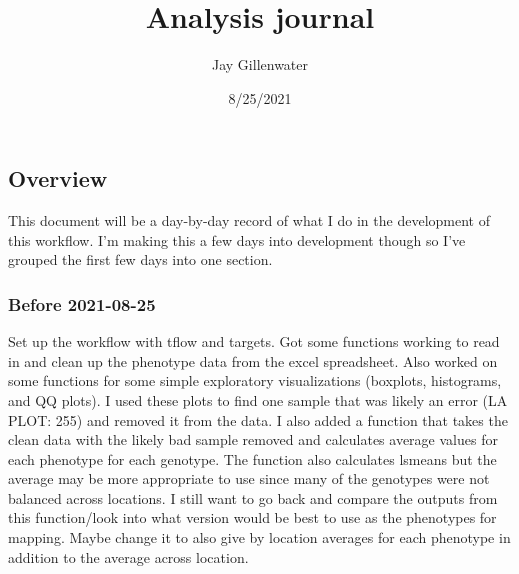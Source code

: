 \documentclass[
]{article}
\title{Analysis journal}
\author{Jay Gillenwater}
\date{8/25/2021}
\begin{document}
\maketitle

\hypertarget{overview}{%
\subsection{Overview}\label{overview}}

This document will be a day-by-day record of what I do in the
development of this workflow. I'm making this a few days into
development though so I've grouped the first few days into one section.

\hypertarget{before-2021-08-25}{%
\subsubsection{Before 2021-08-25}\label{before-2021-08-25}}

Set up the workflow with tflow and targets. Got some functions working
to read in and clean up the phenotype data from the excel spreadsheet.
Also worked on some functions for some simple exploratory visualizations
(boxplots, histograms, and QQ plots). I used these plots to find one
sample that was likely an error (LA PLOT: 255) and removed it from the
data. I also added a function that takes the clean data with the likely
bad sample removed and calculates average values for each phenotype for
each genotype. The function also calculates lsmeans but the average may
be more appropriate to use since many of the genotypes were not balanced
across locations. I still want to go back and compare the outputs from
this function/look into what version would be best to use as the
phenotypes for mapping. Maybe change it to also give by location
averages for each phenotype in addition to the average across location.
\end{document}
